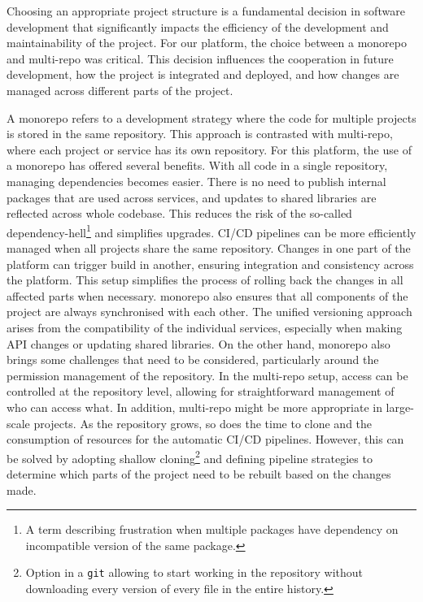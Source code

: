 Choosing an appropriate project structure is a fundamental decision in software development that significantly impacts the efficiency of the development and maintainability of the project.
For our platform, the choice between a \ac{monorepo} and \ac{multi-repo} was critical.
This decision influences the cooperation in future development, how the project is integrated and deployed, and how changes are managed across different parts of the project.

A \ac{monorepo} refers to a development strategy where the code for multiple projects is stored in the same repository.
This approach is contrasted with \ac{multi-repo}, where each project or service has its own repository.
For this platform, the use of a monorepo has offered several benefits.
With all code in a single repository, managing dependencies becomes easier.
There is no need to publish internal packages that are used across services, and updates to shared libraries are reflected across whole codebase.
This reduces the risk of the so-called dependency-hell\footnote{A term describing frustration when multiple packages have dependency on incompatible version of the same package.} and simplifies upgrades.
\ac{CI}/\ac{CD} pipelines can be more efficiently managed when all projects share the same repository. Changes in one part of the platform can trigger build in another, ensuring integration and consistency across the platform. 
This setup simplifies the process of rolling back the changes in all affected parts when necessary.
\Acl{monorepo} also ensures that all components of the project are always synchronised with each other. The unified versioning approach arises from the compatibility of the individual services, especially when making API changes or updating shared libraries.
On the other hand, \ac{monorepo} also brings some challenges that need to be considered, particularly around the permission management of the repository.
In the \ac{multi-repo} setup, access can be controlled at the repository level, allowing for straightforward management of who can access what.
In addition, \ac{multi-repo} might be more appropriate in large-scale projects.
As the repository grows, so does the time to clone and the consumption of resources for the automatic \ac{CI}/\ac{CD} pipelines.
However, this can be solved by adopting shallow cloning\footnote{Option in a \texttt{git} allowing to start working in the repository without downloading every version of every file in the entire history.} and defining pipeline strategies to determine which parts of the project need to be rebuilt based on the changes made.

